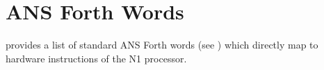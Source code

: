 
\section{ANS Forth Words}
\label{N1_words}

 provides a list of standard ANS Forth words (see \cite{dpans})
which directly map to hardware instructions of the N1 processor.

